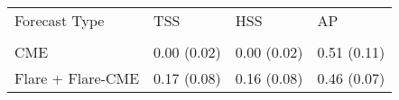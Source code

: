 \begin{tabular}{llll}
\toprule
Forecast Type & TSS & HSS & AP \\
 &  &  &  \\
\midrule
CME & 0.00 (0.02) & 0.00 (0.02) & 0.51 (0.11) \\
Flare + Flare-CME & 0.17 (0.08) & 0.16 (0.08) & 0.46 (0.07) \\
\bottomrule
\end{tabular}
